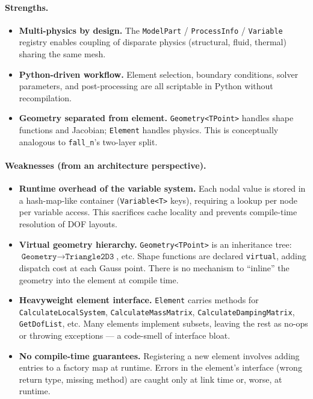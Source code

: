\paragraph{Strengths.}
\begin{itemize}[nosep]
  \item \textbf{Multi-physics by design.}  The \texttt{ModelPart} /
        \texttt{ProcessInfo} / \texttt{Variable} registry enables coupling of
        disparate physics (structural, fluid, thermal) sharing the same mesh.
  \item \textbf{Python-driven workflow.}  Element selection, boundary
        conditions, solver parameters, and post-processing are all scriptable
        in Python without recompilation.
  \item \textbf{Geometry separated from element.}  \texttt{Geometry<TPoint>}
        handles shape functions and Jacobian; \texttt{Element} handles physics.
        This is conceptually analogous to \texttt{fall\_n}'s two-layer split.
\end{itemize}

\paragraph{Weaknesses (from an architecture perspective).}
\begin{itemize}[nosep]
  \item \textbf{Runtime overhead of the variable system.}
        Each nodal value is stored in a hash-map-like container
        (\texttt{Variable<T>} keys), requiring a lookup per node per variable
        access.  This sacrifices cache locality and prevents compile-time
        resolution of DOF layouts.
  \item \textbf{Virtual geometry hierarchy.}  \texttt{Geometry<TPoint>} is an
        inheritance tree: $\texttt{Geometry} \to \texttt{Triangle2D3}$, etc.
        Shape functions are declared \texttt{virtual}, adding dispatch cost at
        each Gauss point.  There is no mechanism to ``inline'' the geometry into
        the element at compile time.
  \item \textbf{Heavyweight element interface.}  \texttt{Element} carries
        methods for \texttt{CalculateLocalSystem},
        \texttt{CalculateMassMatrix}, \texttt{CalculateDampingMatrix},
        \texttt{GetDofList}, etc.  Many elements implement subsets, leaving
        the rest as no-ops or throwing exceptions --- a code-smell of
        interface bloat.
  \item \textbf{No compile-time guarantees.}  Registering a new element
        involves adding entries to a factory map at runtime.  Errors in the
        element's interface (wrong return type, missing method) are caught
        only at link time or, worse, at runtime.
\end{itemize}

